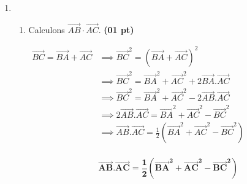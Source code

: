 \documentclass[12pt,a4paper]{article}
\begin{document}
\begin{enumerate}
    \item
          \begin{enumerate}
              \item Calculons \( \overrightarrow{AB} \cdot \overrightarrow{AC} \). \hfill \textbf{(01 pt)}

                    \(
                    \begin{aligned}
                        \overrightarrow{BC}=\overrightarrow{BA}+\overrightarrow{AC} & \implies \overrightarrow{BC}^{2}=(\overrightarrow{BA}+\overrightarrow{AC})^{2}                                                                    \\
                                                                                    & \implies \overrightarrow{BC}^{2}=\overrightarrow{BA}^{2}+\overrightarrow{AC}^{2}+2\overrightarrow{BA}.\overrightarrow{AC}                         \\
                                                                                    & \implies \overrightarrow{BC}^{2}=\overrightarrow{BA}^{2}+\overrightarrow{AC}^{2}-2\overrightarrow{AB}.\overrightarrow{AC}                         \\
                                                                                    & \implies 2\overrightarrow{AB}.\overrightarrow{AC}=\overrightarrow{BA}^{2}+\overrightarrow{AC}^{2}-\overrightarrow{BC}^{2}                         \\
                                                                                    & \implies \overrightarrow{AB}.\overrightarrow{AC}=\frac{1}{2}\left( \overrightarrow{BA}^{2}+\overrightarrow{AC}^{2}-\overrightarrow{BC}^{2}\right) \\
                    \end{aligned}
                    \)

                    \begin{resultbox}
                        \[
                            \mathbf{\overrightarrow{AB}.\overrightarrow{AC}=\frac{1}{2}\left( \overrightarrow{BA}^{2}+\overrightarrow{AC}^{2}-\overrightarrow{BC}^{2}\right)}
                        \]
                    \end{resultbox}


\end{enumerate}
\end{enumerate}
\end{document}
